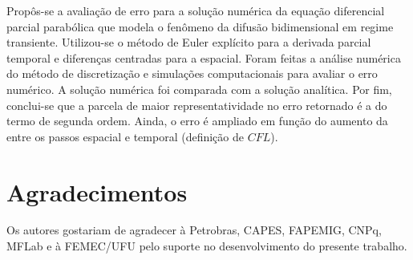 \documentclass[a0,portrait]{a0poster}
\begin{document}
\begin{minipage}[c]{\linewidth}
\begin{framed}
\begin{multicols}{2}
Propôs-se a avaliação de erro para a solução numérica da equação diferencial parcial parabólica que modela o fenômeno da difusão bidimensional em regime transiente. Utilizou-se o método de Euler explícito para a derivada parcial temporal e diferenças centradas para a espacial. Foram feitas a análise numérica do método de discretização e simulações computacionais para avaliar o erro numérico. A solução numérica foi comparada com a solução analítica. Por fim, conclui-se que a parcela de maior representatividade no erro retornado é a do termo de segunda ordem. Ainda, o erro é ampliado em função do aumento da  entre os passos espacial e temporal (definição de $CFL$).

\section*{Agradecimentos}
Os autores gostariam de agradecer à Petrobras, CAPES, FAPEMIG, CNPq, MFLab e à FEMEC/UFU pelo suporte no desenvolvimento do presente trabalho. 
\end{multicols}
\vspace{0.5cm}
\end{framed}
\end{minipage}
\end{document}
